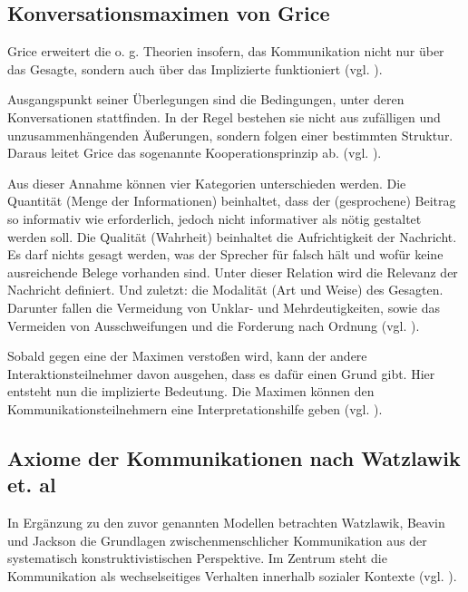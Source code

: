 \subsection{Konversationsmaximen von Grice}
Grice erweitert die o. g. Theorien insofern, das Kommunikation nicht nur über das Gesagte, sondern auch über das Implizierte funktioniert (vgl. \citealp[S. 43f]{grice1975logic}). 

Ausgangspunkt seiner Überlegungen sind die Bedingungen, unter deren Konversationen stattfinden. In der Regel bestehen sie nicht aus zufälligen und unzusammenhängenden Äußerungen, sondern folgen einer bestimmten Struktur. Daraus leitet Grice das sogenannte Kooperationsprinzip ab.  (vgl. \cite[S. 45]{grice1975logic}).

Aus dieser Annahme können vier Kategorien unterschieden werden. Die Quantität (Menge der Informationen) beinhaltet, dass der (gesprochene) Beitrag so informativ wie erforderlich, jedoch nicht informativer als nötig gestaltet werden soll. Die Qualität (Wahrheit) beinhaltet die Aufrichtigkeit der Nachricht. Es darf nichts gesagt werden, was der Sprecher für falsch hält und wofür keine ausreichende Belege vorhanden sind. Unter dieser Relation wird die Relevanz der Nachricht definiert. Und zuletzt: die Modalität (Art und Weise) des Gesagten. Darunter fallen die Vermeidung von Unklar- und Mehrdeutigkeiten, sowie das Vermeiden von Ausschweifungen und die Forderung nach Ordnung (vgl. \cite[S. 45f]{grice1975logic}).

Sobald gegen eine der Maximen verstoßen wird, kann der andere Interaktionsteilnehmer davon ausgehen, dass es dafür einen Grund gibt. Hier entsteht nun die implizierte Bedeutung. Die Maximen können den Kommunikationsteilnehmern eine Interpretationshilfe geben (vgl. \cite[S. 49f]{grice1975logic}).

\subsection{Axiome der Kommunikationen nach Watzlawik et. al}
In Ergänzung zu den zuvor genannten Modellen betrachten Watzlawik, Beavin und Jackson die Grundlagen zwischenmenschlicher Kommunikation aus der systematisch konstruktivistischen Perspektive. Im Zentrum steht die Kommunikation als wechselseitiges Verhalten innerhalb sozialer Kontexte (vgl. \cite{Watzlawick2016-km}). 

